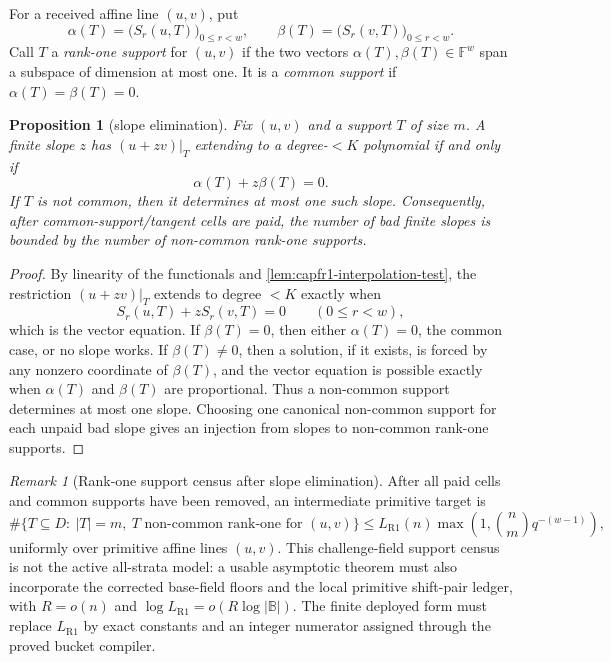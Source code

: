 \documentclass[11pt]{article}
\newtheorem{proposition}[proposition]{Proposition}
\theoremstyle{definition}
\theoremstyle{remark}
\newtheorem{remark}[remark]{Remark}
\newcommand{\F}{\mathbb{F}}
\newcommand{\B}{\mathbb{B}}
\providecommand{\Rone}{\mathrm{R1}}
\begin{document}
For a received affine line \((u,v)\), put
\[
        \alpha(T)=\bigl(S_r(u,T)\bigr)_{0\le r<w},
        \qquad
        \beta(T)=\bigl(S_r(v,T)\bigr)_{0\le r<w}.
\]
Call \(T\) a \emph{rank-one support} for \((u,v)\) if the two vectors \(\alpha(T),\beta(T)\in\F^w\) span a subspace of dimension at most one.  It is a \emph{common support} if \(\alpha(T)=\beta(T)=0\).

\begin{proposition}[slope elimination]\label{prop:capfr1-slope-elimination}
Fix \((u,v)\) and a support \(T\) of size \(m\).  A finite slope \(z\) has \((u+zv)|_T\) extending to a degree-\(<K\) polynomial if and only if
\[
        \alpha(T)+z\beta(T)=0.
\]
If \(T\) is not common, then it determines at most one such slope.  Consequently, after common-support/tangent cells are paid, the number of bad finite slopes is bounded by the number of non-common rank-one supports.
\end{proposition}

\begin{proof}
By linearity of the functionals and \cref{lem:capfr1-interpolation-test}, the restriction \((u+zv)|_T\) extends to degree \(<K\) exactly when
\[
        S_r(u,T)+zS_r(v,T)=0
        \qquad(0\le r<w),
\]
which is the vector equation.  If \(\beta(T)=0\), then either \(\alpha(T)=0\), the common case, or no slope works.  If \(\beta(T)\ne0\), then a solution, if it exists, is forced by any nonzero coordinate of \(\beta(T)\), and the vector equation is possible exactly when \(\alpha(T)
\) and \(\beta(T)\) are proportional.  Thus a non-common support determines at most one slope.  Choosing one canonical non-common support for each unpaid bad slope gives an injection from slopes to non-common rank-one supports.
\end{proof}

\begin{remark}[Rank-one support census after slope elimination]\label{prob:capfr1-rank-one-census}
After all paid cells and common supports have been removed, an intermediate primitive target is
\[
        \#\{T\subseteq D:\ |T|=m,\ T\text{ non-common rank-one for }(u,v)\}
        \le
        L_{\Rone}(n)\max\left(1,\binom n m q^{-(w-1)}\right),
\]
uniformly over primitive affine lines \((u,v)\).  This challenge-field support census is not the active all-strata model: a usable asymptotic theorem must also incorporate the corrected base-field floors and the local primitive shift-pair ledger, with $R=o(n)$ and $\log L_{\Rone}=o(R\log|\B|)$.  The finite deployed form must replace $L_{\Rone}$ by exact constants and an integer numerator assigned through the proved bucket compiler.
\end{remark}
\end{document}
